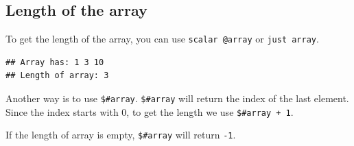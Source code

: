 \documentclass[]{book}
\makeatletter
\newenvironment{Shaded}{\begin{snugshade}}{\end{snugshade}}
\newcommand{\CharTok}[1]{\textcolor[rgb]{0.31,0.60,0.02}{#1}}
\newcommand{\CommentTok}[1]{\textcolor[rgb]{0.56,0.35,0.01}{\textit{#1}}}
\newcommand{\DataTypeTok}[1]{\textcolor[rgb]{0.13,0.29,0.53}{#1}}
\newcommand{\DecValTok}[1]{\textcolor[rgb]{0.00,0.00,0.81}{#1}}
\newcommand{\FunctionTok}[1]{\textcolor[rgb]{0.00,0.00,0.00}{#1}}
\newcommand{\KeywordTok}[1]{\textcolor[rgb]{0.13,0.29,0.53}{\textbf{#1}}}
\newcommand{\NormalTok}[1]{#1}
\newcommand{\StringTok}[1]{\textcolor[rgb]{0.31,0.60,0.02}{#1}}
\newenvironment{kframe}{%
\medskip{}
\setlength{\fboxsep}{.8em}
 \def\at@end@of@kframe{}%
 \ifinner\ifhmode%
  \def\at@end@of@kframe{\end{minipage}}%
  \begin{minipage}{\columnwidth}%
 \fi\fi%
 \def\FrameCommand##1{\hskip\@totalleftmargin \hskip-\fboxsep
 \colorbox{shadecolor}{##1}\hskip-\fboxsep
     \hskip-\linewidth \hskip-\@totalleftmargin \hskip\columnwidth}%
 \MakeFramed {\advance\hsize-\width
   \@totalleftmargin\z@ \linewidth\hsize
   \@setminipage}}%
 {\par\unskip\endMakeFramed%
 \at@end@of@kframe}
\renewenvironment{Shaded}{\begin{kframe}}{\end{kframe}}
\makeatother
\begin{document}
\hypertarget{length-of-the-array}{%
\subsection{Length of the array}\label{length-of-the-array}}

To get the length of the array, you can use \texttt{scalar\ @array} or \texttt{just\ array}.

\begin{Shaded}
\end{Shaded}

\begin{verbatim}
## Array has: 1 3 10
## Length of array: 3
\end{verbatim}

Another way is to use \texttt{\$\#array}. \texttt{\$\#array} will return the index of the last element. Since the index starts with 0, to get the length we use \texttt{\$\#array\ +\ 1}.

If the length of array is empty, \texttt{\$\#array} will return \texttt{-1}.

\begin{Shaded}
\end{Shaded}
\end{document}
